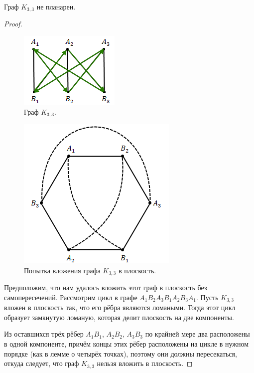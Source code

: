 \begin{statement}
    Граф $K_{3,3}$ не планарен.
\end{statement}
\begin{proof}
    \begin{figure}[h]
        \centering
        \includegraphics[scale=1]{images/c5.1.png}
        \caption{Граф $K_{3,3}$.}
        \label{fig:c5.1}
    \end{figure}
    \begin{figure}[h]
        \centering
        \includegraphics[scale=0.5]{images/c5.2.png}
        \caption{Попытка вложения графа $K_{3,3}$ в плоскость.}
        \label{fig:c5.2}
    \end{figure}
    Предположим, что нам удалось вложить этот граф в плоскость без самопересечений.
    Рассмотрим цикл в графе $A_1B_2A_3B_1A_2B_3A_1$.
    Пусть $K_{3,3}$ вложен в плоскость так, что его рёбра являются ломаными. Тогда этот цикл образует замкнутую ломаную, которая делит плоскость на две компоненты.

    Из оставшихся трёх рёбер $A_1B_1$, $A_2B_2$, $A_3B_3$ по крайней мере два расположены в одной компоненте, причём концы этих рёбер расположены на цикле в нужном порядке (как в лемме о четырёх точках), поэтому они должны пересекаться, откуда следует, что граф $K_{3,3}$ нельзя вложить в плоскость.
\end{proof}

